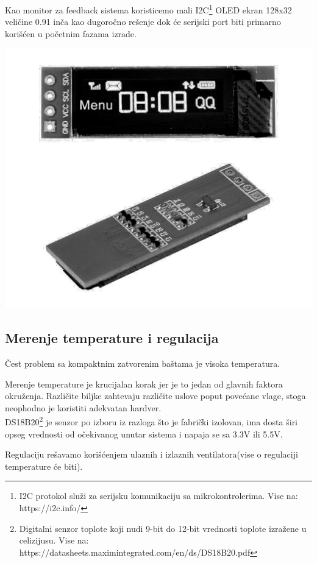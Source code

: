 \documentclass[a4paper,11pt]{book}
\begin{document}
Kao monitor za feedback sistema koristicemo mali I2C\footnote{I2C protokol služi za serijsku komunikaciju sa mikrokontrolerima. Vise na: https://i2c.info/} OLED ekran 128x32 veličine 0.91 inča kao dugoročno rešenje dok će serijski port biti primarno korišćen u početnim fazama izrade.

\includegraphics[width=\textwidth]{oled.png}

\subsection{Merenje temperature i regulacija}

Čest problem sa kompaktnim zatvorenim baštama je visoka temperatura.

Merenje temperature je krucijalan korak jer je to jedan od glavnih faktora okruženja. Različite biljke zahtevaju različite uslove poput povećane vlage, stoga neophodno je koristiti adekvatan hardver.\\ 

\noindent DS18B20\footnote{Digitalni senzor toplote koji nudi 9-bit do 12-bit vrednosti toplote izražene u celizijusu. Vise na: https://datasheets.maximintegrated.com/en/ds/DS18B20.pdf} je senzor po izboru iz razloga što je fabrički izolovan, ima dosta širi opseg vrednosti od očekivanog unutar sistema i napaja se sa 3.3V ili 5.5V.

Regulaciju rešavamo korišćenjem ulaznih i izlaznih ventilatora(vise o regulaciji temperature će biti).
\end{document}
